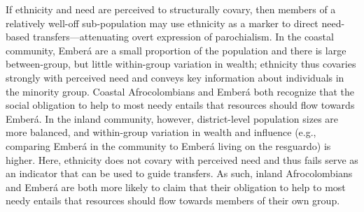 \documentclass[bibauthoryear]{aa}
\begin{document}
 If ethnicity and need are perceived to structurally covary, then members of a relatively well-off sub-population may use ethnicity as a marker to direct need-based transfers---attenuating overt expression of parochialism. In the coastal community, Ember\'a are a small proportion of the population and there is large between-group, but little within-group variation in wealth; ethnicity thus covaries strongly with perceived need and conveys key information about individuals in the minority group. Coastal Afrocolombians and Ember\'a both recognize that the social obligation to help to most needy entails that resources should flow towards Ember\'a.  In the inland community, however, district-level population sizes are more balanced, and within-group variation in wealth and influence (e.g., comparing Ember\'a in the community to Ember\'a living on the resguardo) is higher. Here, ethnicity does not covary with perceived need and thus fails serve as an indicator that can be used to guide transfers. As such, inland Afrocolombians and Ember\'a are both more likely to claim that their obligation to help to most needy entails that resources should flow towards members of their own group. %



\end{document}

